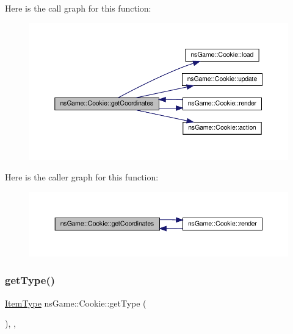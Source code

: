 Here is the call graph for this function\+:\nopagebreak
\begin{figure}[H]
\begin{center}
\leavevmode
\includegraphics[width=350pt]{classns_game_1_1_cookie_ab624101d018f74fb856bdfd7fd97c55e_cgraph}
\end{center}
\end{figure}
Here is the caller graph for this function\+:\nopagebreak
\begin{figure}[H]
\begin{center}
\leavevmode
\includegraphics[width=350pt]{classns_game_1_1_cookie_ab624101d018f74fb856bdfd7fd97c55e_icgraph}
\end{center}
\end{figure}
\mbox{\label{classns_game_1_1_cookie_ac5c28f610947708bc1f31b1e8a88ef42}} 
\subsubsection{\texorpdfstring{get\+Type()}{getType()}}
{\footnotesize\ttfamily \hyperlink{namespacens_game_a5f7db01e6447720e9a145f0b3c68a4d7}{Item\+Type} ns\+Game\+::\+Cookie\+::get\+Type (\begin{DoxyParamCaption}{ }\end{DoxyParamCaption})\hspace{0.3cm}{\ttfamily [inline]}, {\ttfamily [override]}, {\ttfamily [virtual]}}



